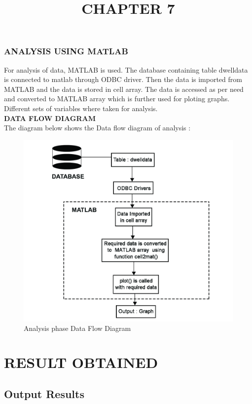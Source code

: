 \documentclass[14pt]{article} %
\begin{document}
\subsubsection{ANALYSIS USING MATLAB}
For analysis of data, MATLAB is used. The database containing table dwelldata is connected to matlab through ODBC driver. Then the data is imported from MATLAB and the data is stored in cell array.
The data is accessed as per need and converted to MATLAB array which is further used for ploting graphs. Different sets of variables where taken for analysis.\\
 \noindent \textbf{DATA FLOW DIAGRAM}\\
The diagram below shows the Data flow diagram of analysis :
\begin{figure}[H]
    \centerline{\includegraphics[width=0.9\linewidth]{MATLABflow.jpg}}
  \caption{Analysis phase Data Flow Diagram}
  \label{fig:figure 12}
\end{figure}

\pagebreak

\title{CHAPTER 7}
\maketitle
\section{RESULT OBTAINED}
\subsection{Output Results}
\end{document}
